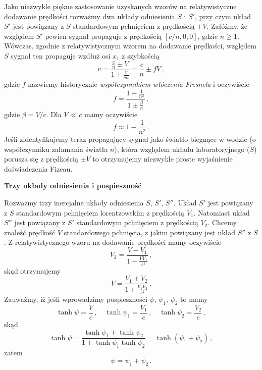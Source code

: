 \documentclass[../main.tex]{subfiles}
\begin{document}
Jako niezwykle piękne zastosowanie uzyskanych wzorów na relatywistyczne dodawanie prędkości rozważmy dwa układy odniesienia \(S\) i \(S'\), przy czym układ \(S'\) jest powiązany z \(S\) standardowym pchnięciem z prędkością \(\pm V\). Załóżmy, że względem \(S'\) pewien sygnał propaguje z prędkością \([c/n,0,0]\), gdzie \(n\geq1\). Wówczas, zgodnie z relatywistycznym wzorem na dodawanie prędkości, względem \(S\) sygnał ten propaguje wzdłuż osi \(x_1\) z szybkością
\begin{equation*}
    v=\frac{\frac{c}{n}\pm V}{1\pm\frac{V}{cn}}=\frac{c}{n}\pm fV\,,
\end{equation*}
gdzie \(f\) nazwiemy historycznie \textit{współczynnikiem włóczenia Fresnela} i oczywiście
\begin{equation*}
    f=\frac{1-\frac{1}{n^2}}{1\pm\frac{\beta}{n}}\,,
\end{equation*}
gdzie \(\beta=V/c\). Dla \(V\ll c\) mamy oczywiście
\begin{equation*}
    f\approx 1-\frac{1}{n^2}\,.
\end{equation*}
Jeśli zidentyfikujemy teraz propagujący sygnał jako światło biegnące w wodzie (o współczynniku załamania światła \(n\)), która względem układu laboratoryjnego (\(S\)) porusza się z prędkością \(\pm V\) to otrzymujemy niezwykle proste wyjaśnienie doświadczenia Fizeau.
\medskip

\noindent\textbf{Trzy układy odniesienia i pospieszność}
\medskip

Rozważmy trzy inercjalne układy odniesienia \(S\), \(S'\), \(S''\). Układ \(S'\) jest powiązany z \(S\) standardowym pchnięciem lorentzowskim z prędkością \(V_1\). Natomiast układ \(S''\) jest powiązany z \(S'\) standardowym pchnięciem z prędkością \(V_2\). Chcemy znaleźć prędkość \(V\) standardowego pchnięcia, z jakim powiązany jest układ \(S''\) z \(S\). Z relatywistycznego wzoru na dodawanie prędkości mamy oczywiście
\begin{equation*}
    V_2=\frac{V-V_1}{1-\frac{VV_1}{c^2}}\,,
\end{equation*}
skąd otrzymujemy
\begin{equation*}
    V=\frac{V_1+V_2}{1+\frac{V_1V_2}{c^2}}\,.
\end{equation*}
Zauważmy, iż jeśli wprowadzimy pospieszności \(\psi\), \(\psi_1\), \(\psi_2\) to mamy
\begin{equation*}
    \tanh\psi=\frac{V}{c}\,,\quad\tanh\psi_1=\frac{V_1}{c}\,,\quad\tanh\psi_2=\frac{V_2}{c}\,,
\end{equation*}
skąd
\begin{equation*}
    \tanh\psi=\frac{\tanh\psi_1+\tanh\psi_2}{1+\tanh\psi_1\tanh\psi_2}=\tanh(\psi_1+\psi_2)\,,
\end{equation*}
zatem
\begin{equation*}
    \psi=\psi_1+\psi_2\,.
\end{equation*}
\end{document}
